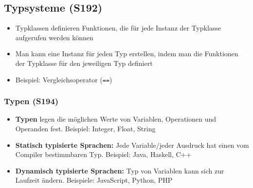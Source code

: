 \subsection{Typsysteme (S192)}
\begin{itemize}
	\item Typklassen definieren Funktionen, die für jede Instanz der Typklasse aufgerufen werden können
	\item Man kann eine Instanz für jeden Typ erstellen, indem man die Funktionen der Typklasse für den jeweiligen Typ definiert
	\item Beispiel: Vergleichsoperator (\texttt{==})
\end{itemize}

\subsubsection{Typen (S194)}
\begin{itemize}
	\item \textbf{Typen} legen die möglichen Werte von Variablen, Operationen und Operanden fest. Beispiel: Integer, Float, String
	\item \textbf{Statisch typisierte Sprachen:} Jede Variable/jeder Ausdruck hat einen vom Compiler bestimmbaren Typ. Beispiel: Java, Haskell, C++
	\item \textbf{Dynamisch typisierte Sprachen:} Typ von Variablen kann sich zur Laufzeit ändern. Beispiele: JavaScript, Python, PHP
\end{itemize}

